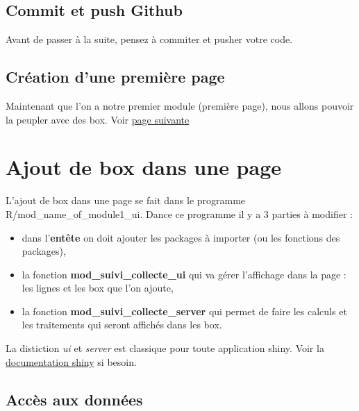 \documentclass[
  letterpaper,
  DIV=11,
  numbers=noendperiod]{scrreprt}
\providecommand{\tightlist}{%
  \setlength{\itemsep}{0pt}\setlength{\parskip}{0pt}}\usepackage{longtable,booktabs,array}
\begin{document}
\hypertarget{commit-et-push-github}{%
\section{Commit et push Github}\label{commit-et-push-github}}

Avant de passer à la suite, pensez à commiter et pusher votre code.

\hypertarget{cruxe9ation-dune-premiuxe8re-page}{%
\section{Création d'une première
page}\label{cruxe9ation-dune-premiuxe8re-page}}

Maintenant que l'on a notre premier module (première page), nous allons
pouvoir la peupler avec des box. Voir
\protect\hyperlink{ajout-de-box-dans-une-page}{page suivante}


\hypertarget{ajout-de-box-dans-une-page}{%
\chapter{Ajout de box dans une page}\label{ajout-de-box-dans-une-page}}

L'ajout de box dans une page se fait dans le programme
R/mod\_name\_of\_module1\_ui. Dance ce programme il y a 3 parties à
modifier :

\begin{itemize}
\tightlist
\item
  dans l'\textbf{entête} on doit ajouter les packages à importer (ou les
  fonctions des packages),\\
\item
  la fonction \textbf{mod\_suivi\_collecte\_ui} qui va gérer l'affichage
  dans la page : les lignes et les box que l'on ajoute,\\
\item
  la fonction \textbf{mod\_suivi\_collecte\_server} qui permet de faire
  les calculs et les traitements qui seront affichés dans les box.
\end{itemize}

La distiction \emph{ui} et \emph{server} est classique pour toute
application shiny. Voir la
\href{https://shiny.posit.co/r/getstarted/shiny-basics/lesson1/}{documentation
shiny} si besoin.

\hypertarget{accuxe8s-aux-donnuxe9es}{%
\section{Accès aux données}\label{accuxe8s-aux-donnuxe9es}}
\end{document}

